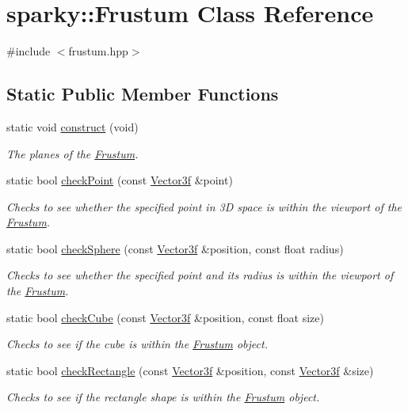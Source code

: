 \hypertarget{classsparky_1_1_frustum}{}\section{sparky\+:\+:Frustum Class Reference}
\label{classsparky_1_1_frustum}


{\ttfamily \#include $<$frustum.\+hpp$>$}

\subsection*{Static Public Member Functions}
\begin{DoxyCompactItemize}
\item 
static void \hyperlink{classsparky_1_1_frustum_a593dffcad645fd82eecf2772afb9c3ce}{construct} (void)
\begin{DoxyCompactList}\small\item\em The planes of the \hyperlink{classsparky_1_1_frustum}{Frustum}. \end{DoxyCompactList}\item 
static bool \hyperlink{classsparky_1_1_frustum_a5da3fbd813191d7cf7e51ce9cd3a4762}{check\+Point} (const \hyperlink{classsparky_1_1_vector3}{Vector3f} \&point)
\begin{DoxyCompactList}\small\item\em Checks to see whether the specified point in 3D space is within the viewport of the \hyperlink{classsparky_1_1_frustum}{Frustum}. \end{DoxyCompactList}\item 
static bool \hyperlink{classsparky_1_1_frustum_a890b76c04856e816767da87804a4aa4b}{check\+Sphere} (const \hyperlink{classsparky_1_1_vector3}{Vector3f} \&position, const float radius)
\begin{DoxyCompactList}\small\item\em Checks to see whether the specified point and its radius is within the viewport of the \hyperlink{classsparky_1_1_frustum}{Frustum}. \end{DoxyCompactList}\item 
static bool \hyperlink{classsparky_1_1_frustum_a315515141358d8890603773da4082fd1}{check\+Cube} (const \hyperlink{classsparky_1_1_vector3}{Vector3f} \&position, const float size)
\begin{DoxyCompactList}\small\item\em Checks to see if the cube is within the \hyperlink{classsparky_1_1_frustum}{Frustum} object. \end{DoxyCompactList}\item 
static bool \hyperlink{classsparky_1_1_frustum_a7e53795669e6a7b6faea3cb896de348b}{check\+Rectangle} (const \hyperlink{classsparky_1_1_vector3}{Vector3f} \&position, const \hyperlink{classsparky_1_1_vector3}{Vector3f} \&size)
\begin{DoxyCompactList}\small\item\em Checks to see if the rectangle shape is within the \hyperlink{classsparky_1_1_frustum}{Frustum} object. \end{DoxyCompactList}\end{DoxyCompactItemize}


